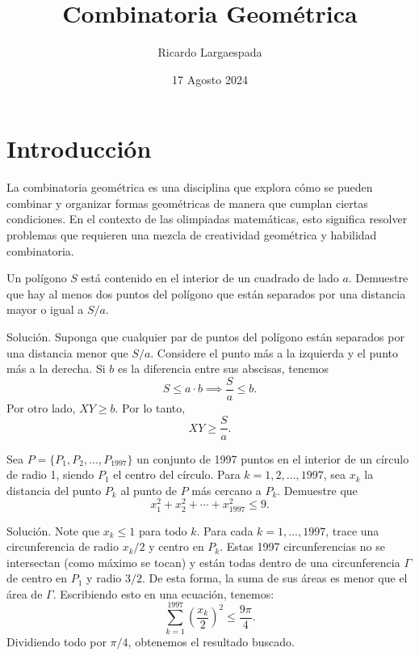 \documentclass[11pt]{scrartcl}
\begin{document}
\title{Combinatoria Geométrica}
\author{Ricardo Largaespada}
\date{17 Agosto 2024}

\maketitle
\section{Introducción}

La combinatoria geométrica es una disciplina que explora cómo se pueden combinar y organizar formas geométricas de manera que cumplan ciertas condiciones. En el contexto de las olimpiadas matemáticas, esto significa resolver problemas que requieren una mezcla de creatividad geométrica y habilidad combinatoria.

\begin{example}
    Un polígono \( S \) está contenido en el interior de un cuadrado de lado \( a \). Demuestre que hay al menos dos puntos del polígono que están separados por una distancia mayor o igual a \( S/a \).
\end{example}
Solución. Suponga que cualquier par de puntos del polígono están separados por una distancia menor que \( S/a \). Considere el punto más a la izquierda y el punto más a la derecha. Si \( b \) es la diferencia entre sus abscisas, tenemos
\[
S \leq a \cdot b \implies \frac{S}{a} \leq b.
\]
Por otro lado, \( XY \geq b \). Por lo tanto,
\[
XY \geq \frac{S}{a}.
\]

\begin{example}[Ibero 1997]
    Sea \( P = \{P_1, P_2, \ldots, P_{1997}\} \) un conjunto de 1997 puntos en el interior de un círculo de radio 1, siendo \( P_1 \) el centro del círculo. Para \( k = 1, 2, \ldots, 1997 \), sea \( x_k \) la distancia del punto \( P_k \) al punto de \( P \) más cercano a \( P_k \). Demuestre que
\[
x_1^2 + x_2^2 + \cdots + x_{1997}^2 \leq 9.
\]
\end{example}

Solución. Note que \( x_k \leq 1 \) para todo \( k \). Para cada \( k = 1, \ldots, 1997 \), trace una circunferencia de radio \( x_k/2 \) y centro en \( P_k \). Estas 1997 circunferencias no se intersectan (como máximo se tocan) y están todas dentro de una circunferencia \( \Gamma \) de centro en \( P_1 \) y radio \( 3/2 \). De esta forma, la suma de sus áreas es menor que el área de \( \Gamma \). Escribiendo esto en una ecuación, tenemos:
\[
\sum_{k=1}^{1997} \left(\frac{x_k}{2}\right)^2 \leq \frac{9\pi}{4}.
\]
Dividiendo todo por \( \pi/4 \), obtenemos el resultado buscado.\\
\end{document}
